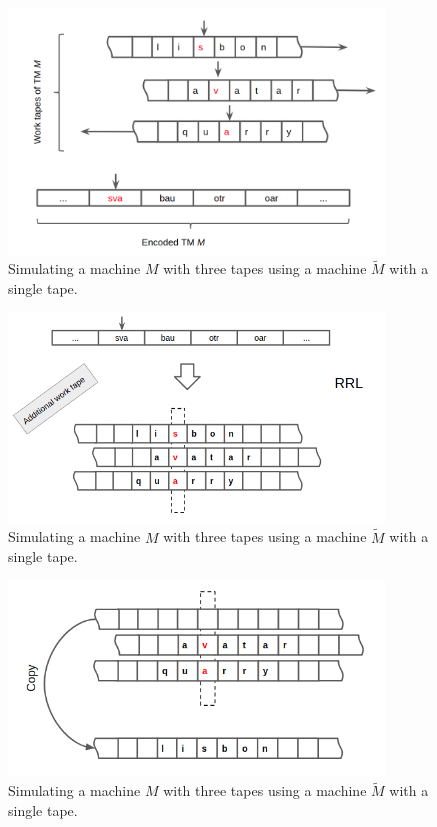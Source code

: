 \documentclass[a4paper,12pt]{article}
\begin{document}
\begin{figure}[!ht]
\centering
\includegraphics[width=10cm]{ex1.png}
\caption{Simulating a machine $M$ with three tapes using a machine $\widetilde{M}$ with a single tape.}
\label{fig:scetch2}
\end{figure}

\begin{figure}[!ht]
\centering
\includegraphics[width=10cm]{ex2.png}
\caption{Simulating a machine $M$ with three tapes using a machine $\widetilde{M}$ with a single tape.}
\label{fig:scetch2}
\end{figure}

\begin{figure}[!ht]
\centering
\includegraphics[width=10cm]{ex3.png}
\caption{Simulating a machine $M$ with three tapes using a machine $\widetilde{M}$ with a single tape.}
\label{fig:scetch2}
\end{figure}
\end{document}
